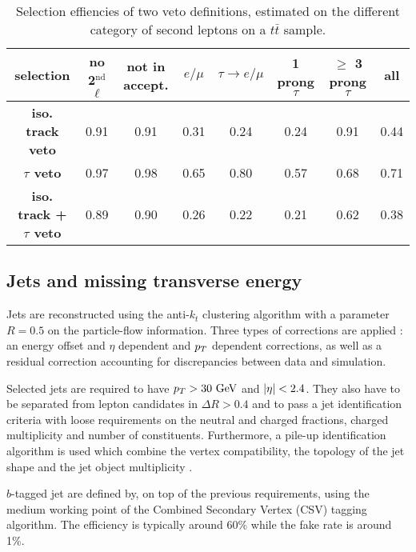     \begin{table}
    \hspace*{-1.2cm}
    \begin{tabular}{|c|c|cccccc|}
        \hline
        \textbf{selection}                  & no 2$^\text{nd}$ $\ell$ & not in accept. & $e/\mu$ & $\tau \rightarrow e/\mu$ & 1 prong $\tau $&$\geq$ 3 prong $\tau$ & all \\
        \hline
        \textbf{iso. track veto}            & 0.91                    & 0.91  & 0.31  & 0.24  & 0.24  & 0.91  & 0.44  \\  
        \textbf{$\tau$ veto}                & 0.97                    & 0.98  & 0.65  & 0.80  & 0.57  & 0.68  & 0.71  \\
        \hline
        \textbf{iso. track + $\tau$ veto}   & 0.89                    & 0.90  & 0.26  & 0.22  & 0.21  & 0.62  & 0.38 \\
        \hline
    \end{tabular}
        \caption{Selection effiencies of two veto definitions, estimated on the different category of second leptons on a $t\bar{t}$ sample.}
        \label{tab:secondLeptonVetoPerformances}
    \end{table}

        \subsection{Jets and missing transverse energy}

       Jets are reconstructed using the anti-$k_t$ clustering algorithm with a parameter $R = 0.5$ on the particle-flow
       information. Three types of corrections are applied : an energy offset and $\eta$ dependent and $p_T$ dependent
       corrections, as well as a residual correction accounting for discrepancies between data and simulation.

       Selected jets are required to have $p_T > 30 ~\text{GeV}$ and $\left| \eta \right| < 2.4$. They also have to be separated from
       lepton candidates in $\Delta R > 0.4$ and to pass a jet identification criteria  with loose
       requirements on the neutral and charged fractions, charged multiplicity and number of constituents. Furthermore,
       a pile-up identification algorithm is used which combine the vertex compatibility, the topology of the jet shape 
       and the jet object multiplicity .

       $b$-tagged jet are defined by, on top of the previous requirements, using the medium working point of the 
       Combined Secondary Vertex (CSV) tagging algorithm. The efficiency is typically around 60\% while the fake rate is
       around 1\%.

